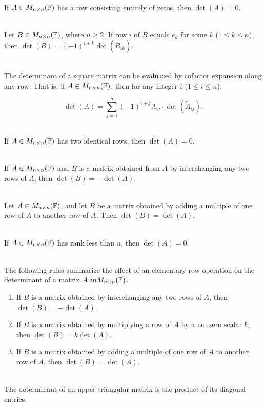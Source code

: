 \begin{corollary}
	\hfill\\
	If $A \in M_{n \times n}(\mathbb{F})$ has a row consisting entirely of zeros, then $\det(A) = 0$.
\end{corollary}

\begin{lemma}
	\hfill\\
	Let $B \in M_{n \times n}(\mathbb{F})$, where $n \geq 2$. If row $i$ of $B$ equals $e_k$ for some $k$ ($1 \leq k \leq n$), then $\det(B) = (-1)^{i+k}\det(\tilde{B}_{ik})$.
\end{lemma}

\begin{theorem}
	\hfill\\
	The determinant of a square matrix can be evaluated by cofactor expansion along any row. That is, if $A \in M_{n \times n}(\mathbb{F})$, then for any integer $i$ ($1 \leq i \leq n$),

	\[\det(A) = \sum_{j=1}^{n}(-1)^{i+j}A_{ij}\cdot\det(\tilde{A}_{ij}).\]
\end{theorem}

\begin{corollary}
	\hfill\\
	If $A \in M_{n \times n}(\mathbb{F})$ has two identical rows, then $\det(A) = 0$.
\end{corollary}

\begin{theorem}
	\hfill\\
	If $A \in M_{n \times n}(\mathbb{F})$ and $B$ is a matrix obtained from $A$ by interchanging any two rows of $A$, then $\det(B) = -\det(A)$.
\end{theorem}

\begin{theorem}
	\hfill\\
	Let $A \in M_{n \times n}(\mathbb{F})$, and let $B$ be a matrix obtained by adding a multiple of one row of $A$ to another row of $A$. Then $\det(B) = \det(A)$.
\end{theorem}

\begin{corollary}
	\hfill\\
	If $A \in M_{n \times n}(\mathbb{F})$ has rank less than $n$, then $\det(A) = 0$.
\end{corollary}

\begin{remark}\label{Remark 4.1}
	\hfill\\
	The following rules summarize the effect of an elementary row operation on the determinant of a matrix $A \ in M_{n \times n}(\mathbb{F})$.

	\begin{enumerate}
		\item If $B$ is a matrix obtained by interchanging any two rows of $A$, then $\det(B) = -\det(A)$.
		\item If $B$ is a matrix obtained by multiplying a row of $A$ by a nonzero scalar $k$, then $\det(B) = k\det(A)$.
		\item If $B$ is a matrix obtained by adding a multiple of one row of $A$ to another row of $A$, then $\det(B) = \det(A)$.
	\end{enumerate}
\end{remark}

\begin{lemma}
	\hfill\\
	The determinant of an upper triangular matrix is the product of its diagonal entries.
\end{lemma}
